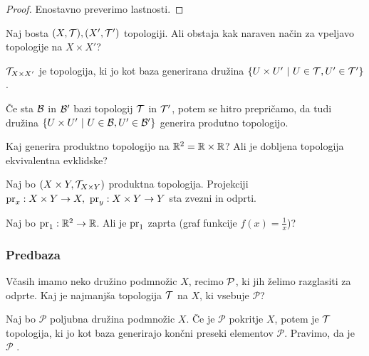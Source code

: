 \begin{proof}
    Enostavno preverimo lastnosti.
\end{proof}

\begin{primer}
    Naj bosta $(X, \mathcal{T}), (X', \mathcal{T}')$ topologiji. Ali obstaja kak naraven način za vpeljavo topologije na $X \times X'$?
\end{primer}
    
\begin{definicija}
     $\mathcal{T}_{X \times X'}$ je topologija, ki jo kot baza generirana družina $\left\{U \times U' \ | \ U \in \mathcal{T}, U' \in \mathcal{T}'\right\}$.
\end{definicija}

\begin{opomba}
    Če sta $\mathcal{B}$ in $\mathcal{B}'$ bazi topologij $\mathcal{T}$ in $\mathcal{T}'$, potem se hitro prepričamo, da tudi družina $\left\{U \times U' \ | \ U \in \mathcal{B}, U' \in \mathcal{B}'\right\}$ generira produtno topologijo.
\end{opomba}

\begin{primer}
    Kaj generira produktno topologijo na $\mathbb{R}^2 = \mathbb{R} \times \mathbb{R}$? Ali je dobljena topologija ekvivalentna evklidske?
\end{primer}

\begin{trditev}
    Naj bo $(X \times Y, \mathcal{T}_{X \times Y})$ produktna topologija. Projekciji $\operatorname{pr}_x: X \times Y \to X, \ \operatorname{pr}_y: X \times Y \to Y$ sta zvezni in odprti.
\end{trditev}

\begin{primer} 
    Naj bo $\operatorname{pr}_1: \mathbb{R}^2 \to \mathbb{R}$. Ali je $\operatorname{pr}_1$ zaprta (graf funkcije $f(x) = \frac{1}{x}$)?    
\end{primer}

\subsubsection{Predbaza}

Včasih imamo neko družino podmnožic $X$, recimo $\mathcal{P}$, ki jih želimo razglasiti za odprte. Kaj je najmanjša topologija $\mathcal{T}$ na $X$, ki vsebuje $\mathcal{P}$?

\begin{trditev}
    Naj bo $\mathcal{P}$ poljubna družina podmnožic $X$. Če je $\mathcal{P}$ pokritje $X$, potem je $\mathcal{T}$ topologija, ki jo kot baza generirajo končni preseki elementov $\mathcal{P}$.
    Pravimo, da je $\mathcal{P}$ .
\end{trditev}

